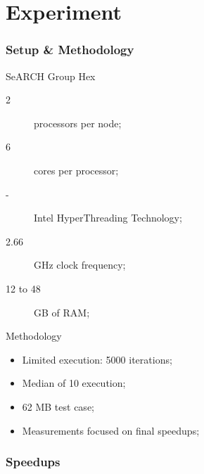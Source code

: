 \section{Experiment}


\begin{frame}
	\frametitle{Setup \& Methodology}

	\begin{block}{SeARCH Group Hex}
		\begin{description}
			\item [2] processors per node;
			\item [6] cores per processor;
			\item [-] Intel\textsuperscript{\textregistered} HyperThreading Technology;
			\item [2.66] GHz clock frequency;
			\item [12 to 48] GB of RAM;
		\end{description}
	\end{block}

	\begin{block}{Methodology}
		\begin{itemize}
			\item Limited execution: 5000 iterations;
			\item Median of 10 execution;
			\item 62 MB test case;
			\item Measurements focused on final speedups;
		\end{itemize}
	\end{block}
\end{frame}

\begin{frame}
	\frametitle{Speedups}
\end{frame}
